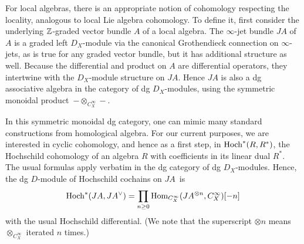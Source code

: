 %
%

For local algebras, there is an appropriate notion of cohomology respecting the locality, 
analogous to local Lie algebra cohomology. 
To define it, first consider the underlying $\mathbb Z$-graded vector bundle $A$ of a local algebra. 
The $\infty$-jet bundle $JA$ of $A$ is a graded left $D_X$-module via the canonical Grothendieck connection on $\infty$-jets,
as is true for any graded vector bundle,
but it has additional structure as well.
Because the differential and product on $A$ are differential operators, 
they intertwine with the $D_X$-module structure on $JA$.
Hence $JA$ is also a dg associative algebra in the category of dg $D_X$-modules,
using the symmetric monoidal product~$- \otimes_{C^\infty_X} -$. 



In this symmetric monoidal dg category, 
one can mimic many standard constructions from homological algebra.
For our current purposes, we are interested in cyclic cohomology,
and hence as a first step, in ${\rm Hoch}^*(R,R^*)$, the Hochschild cohomology of an algebra $R$ with coefficients in its linear dual $R^*$.
The usual formulas apply verbatim in the dg category of dg $D_X$-modules.
Hence, the dg $D$-module of Hochschild cochains on $JA$~is 
\[
{\rm Hoch}^* (JA, JA^\vee) = \prod_{n \geq 0} {\rm Hom}_{C^\infty_X} (JA^{\otimes n}, C^\infty_X)[-n]
\]
with the usual Hochschild differential.
(We note that the superscript $\otimes n$ means $\otimes_{C^\infty_X}$ iterated $n$ times.)

